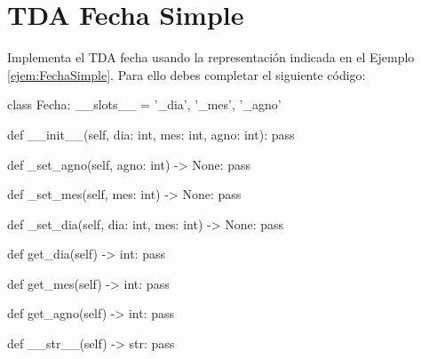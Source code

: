 


%


 
\separacion
\section{TDA Fecha Simple} \label{sed:TDAFechaSimple}

Implementa el TDA fecha usando la representación indicada en el Ejemplo \ref{ejem:FechaSimple}. Para ello debes completar el siguiente código:

\begin{pyverbatim}[][frame=single, fontsize=\small]
class Fecha:
    __slots__ = '_dia', '_mes', '_agno'

    def __init__(self, dia: int, mes: int, agno: int):
        pass

    def _set_agno(self, agno: int) -> None:
        pass

    def _set_mes(self, mes: int) -> None:
        pass

    def _set_dia(self, dia: int, mes: int) -> None:
        pass

    def get_dia(self) -> int:
        pass

    def get_mes(self) -> int:
        pass

    def get_agno(self) -> int:
        pass

    def __str__(self) -> str:
        pass
\end{pyverbatim}


